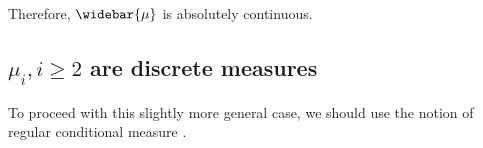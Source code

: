 Therefore, $\widebar{\mu}$ is absolutely continuous.
\subsection{\texorpdfstring{$\mu_i, i \geq 2$}{µ\_i, i ≥ 2} are discrete measures}
\label{section:discrete_measures}
To proceed with this slightly more general case,
we should use the notion of regular conditional measure \cite[Definition 10.4.2]{Bogachev2007}.

